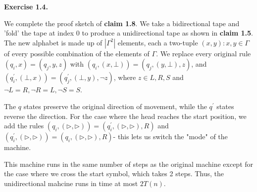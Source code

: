 \documentclass[a4paper]{article}
\newenvironment{exercise}[1]{
	\par
	\noindent\textbf{Exercise #1.}\quad
}{
	\par
	\bigskip
}
\begin{document}
\begin{exercise}{1.4}
    We complete the proof sketch of \textbf{claim 1.8}. We take a bidirectional tape and 'fold' the tape at index 0 to produce a unidirectional tape as shown in \textbf{claim 1.5}. The new alphabet is made up of $|\Gamma^2|$ elements, each a two-tuple $(x,y):x,y \in \Gamma$ of every possible combination of the elements of $\Gamma$. We replace every original  rule $(q_i,x)=(q_j,y,z)$ with $(q_i,(x,\bot))=(q_j,(y,\bot),z)$, and $(q^{\prime}_i,(\bot,x))=(q^{\prime}_j,(\bot,y),\lnot z)$, where $z \in {L,R,S}$ and $\lnot L=R,\lnot R=L, \lnot S=S$.
    
    The $q$ states preserve the original direction of movement, while the $q^{\prime}$ states reverse the direction. For the case where the head  reaches the start position, we add the rules $(q_i,(\rhd,\rhd))=(q^{\prime}_i,(\rhd,\rhd),R)$ and $(q^{\prime}_i,(\rhd,\rhd))=(q_i,(\rhd,\rhd),R)$- this lets us switch the "mode" of the machine.
    
    This machine runs in the same number of steps as the original machine except for the case where we cross the start symbol, which takes 2 steps. Thus, the unidirectional mahcine runs in time at most $2T(n)$.
\end{exercise}
\end{document}
